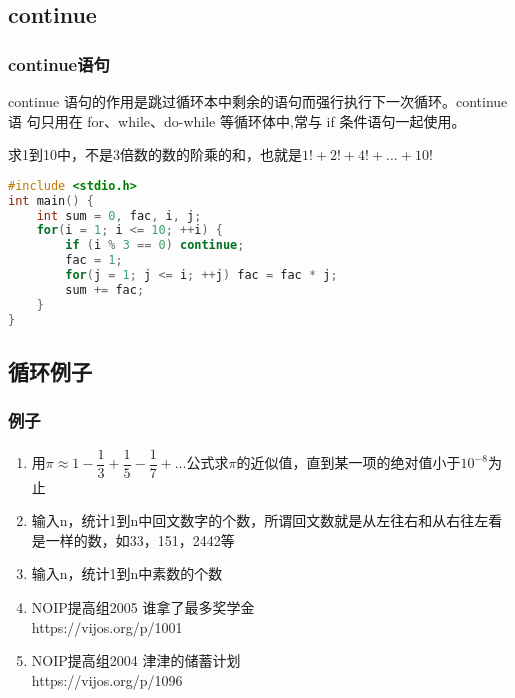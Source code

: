 \documentclass[cjk,slidestop,mathserif,hyperref={CJKbookmarks=true}]{beamer}
\begin{document}
\begin{CJK*}{UTF8}{gkai}
\subsection{continue}
\begin{frame}[fragile]
    \frametitle{continue语句}
    \begin{definition}
    continue 语句的作用是跳过循环本中剩余的语句而强行执行下一次循环。continue 语
句只用在 for、while、do-while 等循环体中,常与 if 条件语句一起使用。
    \end{definition}
    求1到10中，不是3倍数的数的阶乘的和，也就是$1!+2!+4!+\dots+10!$
        \begin{lstlisting}[language=c]
#include <stdio.h>
int main() {
    int sum = 0, fac, i, j;
    for(i = 1; i <= 10; ++i) {
        if (i % 3 == 0) continue;
        fac = 1;
        for(j = 1; j <= i; ++j) fac = fac * j;
        sum += fac;
    }
}
        \end{lstlisting}
\end{frame}

\subsection{循环例子}
\begin{frame}[fragile]
    \frametitle{例子}
    \begin{enumerate}
        \item 用$\pi \approx 1 - \dfrac{1}{3} + \dfrac{1}{5}-\dfrac{1}{7}+\dots$公式求$\pi$的近似值，直到某一项的绝对值小于$10^{-8}$为止
        \item 输入n，统计1到n中回文数字的个数，所谓回文数就是从左往右和从右往左看是一样的数，如33，151，2442等
        \item 输入n，统计1到n中素数的个数
        \item NOIP提高组2005 \quad 谁拿了最多奖学金 \\
        https://vijos.org/p/1001
        \item NOIP提高组2004 \quad 津津的储蓄计划 \\
        https://vijos.org/p/1096
    \end{enumerate}
\end{frame}





\end{CJK*}
\end{document}
